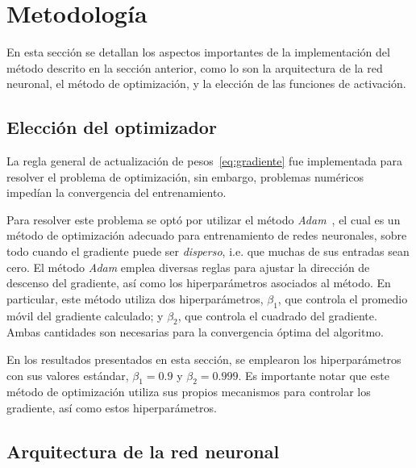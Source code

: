 \section{Metodología}
En esta sección se detallan los aspectos importantes de la implementación del método
descrito en la sección anterior, como lo son la arquitectura de la red neuronal, el método
de optimización, y la elección de las funciones de activación.

\subsection{Elección del optimizador}
La regla general de actualización de pesos~\eqref{eq:gradiente} fue implementada para 
resolver el problema de optimización, sin embargo, problemas numéricos impedían la
convergencia del entrenamiento.

Para resolver este problema se optó por utilizar el método \emph{Adam}~\cite{kingmaAdamMethodStochastic2017},
el cual es un método de optimización adecuado para entrenamiento de redes neuronales,
sobre todo cuando el gradiente puede ser \emph{disperso}, i.e. que muchas de sus entradas
sean cero.
El método \emph{Adam} emplea diversas reglas para ajustar la dirección de descenso del
gradiente, así como los hiperparámetros asociados al método. En particular, este método
utiliza dos hiperparámetros, $\beta_1$, que controla el promedio móvil
del gradiente calculado; y $\beta_2$, que controla el cuadrado del gradiente. Ambas
cantidades son necesarias para la convergencia óptima del algoritmo.

En los resultados presentados en esta sección, se emplearon los hiperparámetros con sus
valores estándar, $\beta_1=0.9$ y $\beta_2=0.999$. Es importante notar que este método
de optimización utiliza sus propios mecanismos para controlar los gradiente, así como
estos hiperparámetros.

\subsection{Arquitectura de la red neuronal}

